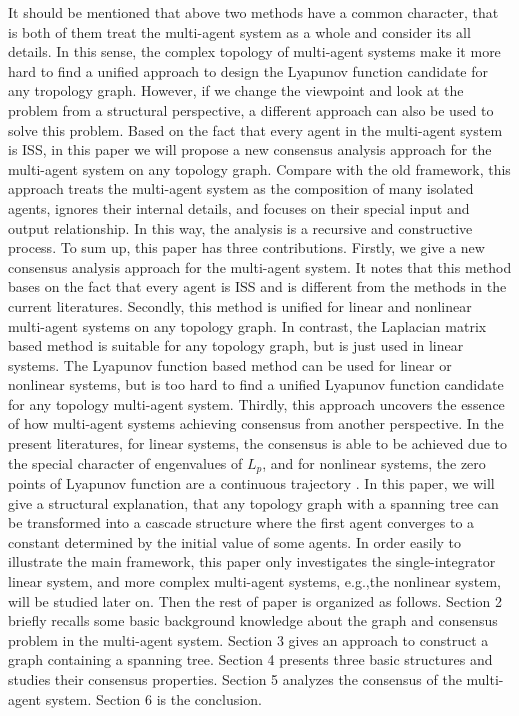 \documentclass[english]{cccconf}
\begin{document}
It should be mentioned that above two methods have a common character, that is both of them treat the multi-agent system as a whole and consider its all details. In this sense, the complex topology of  multi-agent systems make it more hard to find a unified approach to design the Lyapunov function candidate for  any tropology graph. However, if we change the viewpoint and look at the problem from a structural perspective, a different approach can also be used to solve this problem. Based on the fact that every agent in the multi-agent system is ISS, in this paper we will propose a new consensus analysis approach for the multi-agent system on any topology graph. Compare with the old framework, this approach treats the multi-agent system as the composition of many isolated agents, ignores their internal details, and focuses on their special  input and output relationship. In this way, the analysis is a recursive and constructive process. To sum up, this paper has three contributions. Firstly, we give a new consensus analysis approach for the multi-agent system. It notes that this method bases on the fact that every agent is ISS and is different from the methods in the current literatures.  Secondly, this method is unified for linear and nonlinear  multi-agent systems on any topology graph. In contrast, the  Laplacian matrix  based method is suitable for any topology graph, but is just used in linear systems. The Lyapunov function based method can be used for linear or nonlinear systems, but is too hard to find a unified Lyapunov function candidate for any topology multi-agent system. Thirdly,  this approach uncovers the essence of how multi-agent systems achieving consensus from another perspective. In the present literatures, for linear systems, the consensus is able to be achieved  due to the  special character of  engenvalues of $L_p$,  and for nonlinear systems, the zero points of  Lyapunov function are a continuous trajectory . In this paper, we will give a structural explanation, that any topology graph with a spanning tree can be transformed into a cascade structure where the first agent converges to a constant determined by the initial value of  some agents. In order easily to  illustrate the main framework, this paper only investigates  the single-integrator linear system, and  more complex multi-agent systems, e.g.,the nonlinear system, will be studied later on. Then the rest of paper is organized as follows. Section 2 briefly recalls some basic background knowledge about the graph and consensus problem in the multi-agent system. Section 3 gives an approach to construct a graph containing a spanning tree. Section 4 presents three basic structures and studies their consensus properties. Section 5 analyzes the consensus of the multi-agent system. Section 6 is the conclusion.
\end{document}
